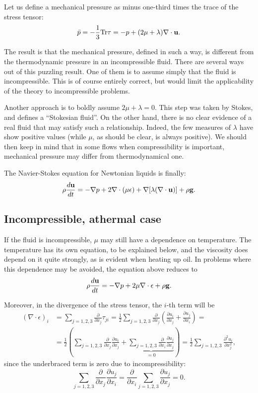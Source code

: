 Let us define a mechanical pressure as minus one-third times the trace
of the stress tensor:
\[
\bar{p}=
-\frac13 \mathrm{Tr} \tau = 
- p
+ (2 \mu  + \lambda ) \nabla\cdot \mathbf{u} .
\]

The result is that the mechanical pressure, defined in such a way, is
different from the thermodynamic pressure in an incompressible fluid.
There are several ways out of this puzzling result. One of them is to
assume simply that the fluid is incompressible. This is of course
entirely correct, but would limit the applicability of the theory to
incompressible problems.

Another approach is to boldly assume $2\mu+\lambda=0$. This step was
taken by Stokes, and defines a ``Stokesian fluid''. On the other hand,
there is no clear evidence of a real fluid that may satisfy such a
relationship. Indeed, the few measures of $\lambda$ have show positive
values (while $\mu$, as should be clear, is always positive). We
should then keep in mind that in some flows when compressibility is
important, mechanical pressure may differ from thermodynamical one.

The Navier-Stokes equation for Newtonian liquids is finally:
\[
\rho \frac{d\mathbf{u} }{dt} =
- \nabla p +
2 \nabla \cdot ( \mu \epsilon)
+ \nabla [ \lambda ( \nabla\cdot\mathbf{u} ) ]
+ \rho \mathbf{g} .
\]

\subsection{Incompressible, athermal case}

If the fluid is incompressible, $\mu$ may still have a dependence on
temperature. The temperature has its own equation, to be explained below,
and the viscosity does depend on it quite strongly, as is evident when
heating up oil. In problems where this dependence may be avoided, the
equation above reduces to
\[
\rho \frac{d\mathbf{u} }{dt} =
- \nabla p +
2 \mu  \nabla \cdot \epsilon
+ \rho \mathbf{g} .
\]

Moreover, in the divergence of the stress tensor, the $i$-th term will be
\begin{align*}
(\nabla \cdot \epsilon)_i &=
\sum_{j=1,2,3} 
\frac{\partial}{\partial x_j} \tau_{ji} =
\frac12
\sum_{j=1,2,3} 
\frac{\partial}{\partial x_j} 
\left(
\frac{\partial u_i}{\partial x_j} +
\frac{\partial u_j}{\partial x_i}
\right)
  = \\
  &=
\frac12
\left(
\sum_{j=1,2,3} 
\frac{\partial}{\partial x_j} 
\frac{\partial u_i}{\partial x_j} +
\underbrace{
  \sum_{j=1,2,3} 
  \frac{\partial}{\partial x_i} 
  \frac{\partial u_j}{\partial x_j}}_{=0}
\right)
                            =
                            \frac12
\sum_{j=1,2,3} 
\frac{\partial^2 u_i }{\partial x_j^2} ,
\end{align*}
since the underbraced term is zero due to incompressibility:
\[
\sum_{j=1,2,3} 
\frac{\partial}{\partial x_j} 
\frac{\partial u_j}{\partial x_i} =
\frac{\partial}{\partial x_i} 
\sum_{j=1,2,3} 
\frac{\partial u_j}{\partial x_j} = 0 .
\]

